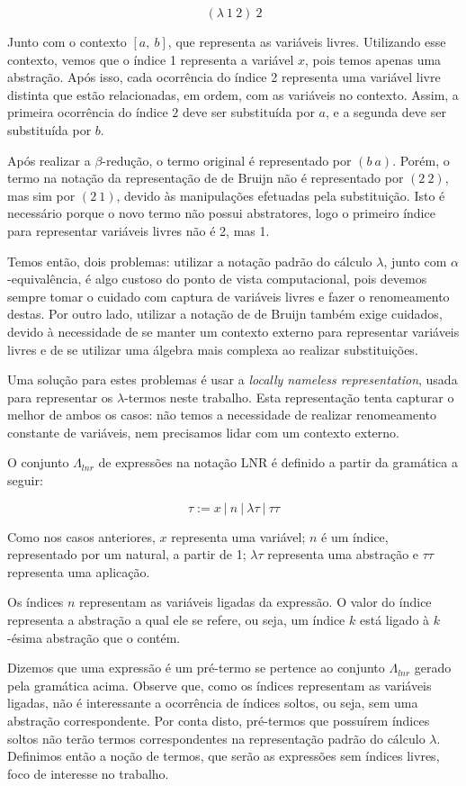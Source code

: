 \[ (\lambda\ 1\ 2)\ 2 \]

Junto com o contexto $[a,\ b]$, que representa as variáveis livres.  Utilizando
esse contexto, vemos que o índice 1 representa a variável $x$, pois temos apenas
uma abstração. Após isso, cada ocorrência do índice 2 representa uma variável
livre distinta que estão relacionadas, em ordem, com as variáveis no contexto.
Assim, a primeira ocorrência do índice $2$ deve ser substituída por $a$, e a
segunda deve ser substituída por $b$.

Após realizar a $\beta$-redução, o termo original é representado por $(b\ a)$.
Porém, o termo na notação da representação de de Bruijn não é representado por
$(2\ 2)$, mas sim por $(2\ 1)$, devido às manipulações efetuadas pela
substituição. Isto é necessário porque o novo termo não possui abstratores, logo
o primeiro índice para representar variáveis livres não é 2, mas 1.

Temos então, dois problemas: utilizar a notação padrão do cálculo $\lambda$,
junto com $\alpha$-equivalência, é algo custoso do ponto de vista computacional,
pois devemos sempre tomar o cuidado com captura de variáveis livres e fazer o
renomeamento destas. Por outro lado, utilizar a notação de de Bruijn também
exige cuidados, devido à necessidade de se manter um contexto externo para
representar variáveis livres e de se utilizar uma álgebra mais complexa ao
realizar substituições.

Uma solução para estes problemas é usar a \textit{locally nameless
representation}, usada para representar os $\lambda$-termos neste trabalho. Esta
representação tenta capturar o melhor de ambos os casos: não temos a necessidade
de realizar renomeamento constante de variáveis, nem precisamos lidar com um
contexto externo.

O conjunto $\Lambda_{lnr}$ de expressões na notação LNR é definido a partir da
gramática a seguir:

\[ \tau := x\ |\ n\ |\ \lambda \tau\ |\ \tau \tau \]

Como nos casos anteriores, $x$ representa uma variável; $n$ é um índice,
representado por um natural, a partir de 1; $\lambda \tau$ representa uma
abstração e $\tau \tau$ representa uma aplicação.

Os índices $n$ representam as variáveis ligadas da expressão. O valor do índice
representa a abstração a qual ele se refere, ou seja, um índice $k$ está ligado
à $k$-ésima abstração que o contém. 

Dizemos que uma expressão é um pré-termo se pertence ao conjunto $\Lambda_{lnr}$
gerado pela gramática acima. Observe que, como os índices representam as
variáveis ligadas, não é interessante a ocorrência de índices soltos, ou seja,
sem uma abstração correspondente. Por conta disto, pré-termos que possuírem
índices soltos não terão termos correspondentes na representação padrão do
cálculo $\lambda$. Definimos então a noção de termos, que serão as expressões
sem índices livres, foco de interesse no trabalho.

